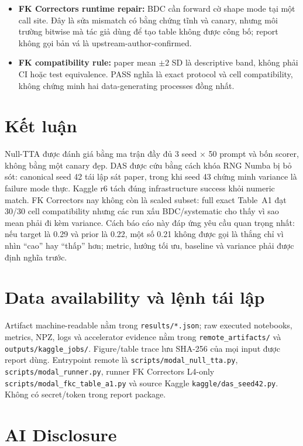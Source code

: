 \documentclass[11pt,a4paper]{article}
\begin{document}
\begin{itemize}
  \item \textbf{FK Correctors runtime repair:} BDC cần forward cờ shape mode tại một call site. Đây là sửa mismatch có bằng chứng tĩnh và canary, nhưng môi trường bitwise mà tác giả dùng để tạo table không được công bố; report không gọi bản vá là upstream-author-confirmed.
  \item \textbf{FK compatibility rule:} paper mean $\pm2$ SD là descriptive band, không phải CI hoặc test equivalence. PASS nghĩa là exact protocol và cell compatibility, không chứng minh hai data-generating processes đồng nhất.
\end{itemize}

\section{Kết luận}

Null-TTA được đánh giá bằng ma trận đầy đủ 3 seed $\times$ 50 prompt và bốn scorer, không bằng một canary đẹp. DAS được cứu bằng cách khóa RNG Numba bị bỏ sót: canonical seed 42 tái lập sát paper, trong khi seed 43 chứng minh variance là failure mode thực. Kaggle r6 tách đúng infrastructure success khỏi numeric match. FK Correctors nay không còn là scaled subset: full exact Table~A1 đạt 30/30 cell compatibility nhưng các run xấu BDC/systematic cho thấy vì sao mean phải đi kèm variance. Cách báo cáo này đáp ứng yêu cầu quan trọng nhất: nếu target là 0.29 và prior là 0.22, một số 0.21 không được gọi là thắng chỉ vì nhìn ``cao'' hay ``thấp'' hơn; metric, hướng tối ưu, baseline và variance phải được định nghĩa trước.

\section*{Data availability và lệnh tái lập}

Artifact machine-readable nằm trong \nolinkurl{results/*.json}; raw executed notebooks, metrics, NPZ, logs và accelerator evidence nằm trong \nolinkurl{remote_artifacts/} và \nolinkurl{outputs/kaggle_jobs/}. Figure/table trace lưu SHA-256 của mọi input được report dùng. Entrypoint remote là \nolinkurl{scripts/modal_null_tta.py}, \nolinkurl{scripts/modal_runner.py}, runner FK Correctors L4-only \nolinkurl{scripts/modal_fkc_table_a1.py} và source Kaggle \nolinkurl{kaggle/das_seed42.py}. Không có secret/token trong report package.

\section*{AI Disclosure}
\end{document}
